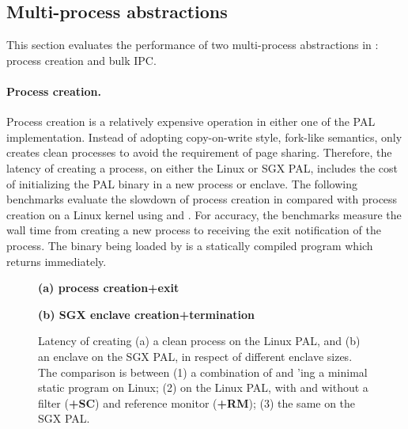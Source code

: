 \subsection{Multi-process abstractions}
\label{sec:eval:pal:multi-proc}

This section evaluates the performance of two multi-process abstractions in \thehostabi:
process creation and bulk IPC.



\paragraph{Process creation.}
Process creation is a relatively expensive
operation in
either one of the PAL implementation.
Instead of adopting copy-on-write style, fork-like semantics,
\thehostabi{} 
only creates clean processes
to avoid the requirement of page sharing.
Therefore, the latency of creating a process,
on either the Linux or SGX PAL,
includes the cost of initializing the PAL binary in a new process or enclave.
The following benchmarks evaluate
the slowdown of process creation in \thehostabi{}
compared with
process creation on a Linux kernel
using  and .
For accuracy,
the benchmarks measure
the wall time from creating a new process
to receiving the exit notification of the process.
The binary being loaded by  is a statically compiled program
which returns immediately.


\begin{figure*}[t!]
\centering
\footnotesize
{}
\parbox{0.59\textwidth}{\centering\bf (a) process creation+exit}
\parbox{0.39\textwidth}{\centering\bf (b) SGX enclave creation+termination}
\caption{Latency of creating (a) a clean process on the Linux PAL, and (b) an enclave on the SGX PAL, in respect of different enclave sizes.
The comparison is between (1) a combination of  and 'ing a minimal static program on Linux; (2)  on the Linux PAL, with and without a \seccomp{} filter ({\bf +SC}) and reference monitor ({\bf +RM}); (3) the same \hostapi{} on the SGX PAL.}
\label{fig:eval:pal:proc-latency}
\end{figure*}



